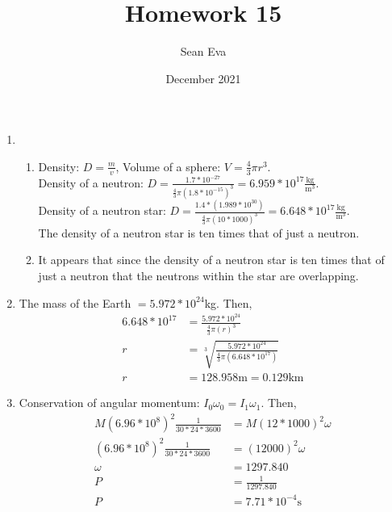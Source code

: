 \documentclass{article}
\title{Homework 15}
\author{Sean Eva}
\date{December 2021}
\begin{document}
\maketitle

\begin{enumerate}
    \item 
    
    \begin{enumerate}
        \item 
        
        Density: $D = \frac{m}{v}$, Volume of a sphere: $V = \frac{4}{3}\pi r^3$.\\Density of a neutron: $D = \frac{1.7*10^{-27}}{\frac{4}{3}\pi (1.8*10^{-15})^3} = 6.959*10^{17} \frac{\text{kg}}{\text{m}^3}$. \\Density of a neutron star: $D = \frac{1.4*(1.989*10^{30})}{\frac{4}{3}\pi(10*1000)^{3}} = 6.648*10^{17}\frac{\text{kg}}{\text{m}^3}$.\\
        The density of a neutron star is ten times that of just a neutron.
        
        \item
        
        It appears that since the density of a neutron star is ten times that of just a neutron that the neutrons within the star are overlapping.
        
    \end{enumerate}
    
    \item
    
    The mass of the Earth $ = 5.972*10^{24}$kg. Then,
    \begin{align*}
        6.648*10^{17} &= \frac{5.972*10^{24}}{\frac{4}{3}\pi(r)^3}\\
        r &= \sqrt[3]{\frac{5.972*10^{24}}{\frac{4}{3}\pi(6.648*10^{17})}}\\
        r &= 128.958\text{m} = 0.129 \text{km}
    \end{align*}
    
    \item
    
    Conservation of angular momentum: $I_0\omega_0 = I_1\omega_1$. Then, 
    \begin{align*}
        M (6.96*10^8)^2 \frac{1}{30*24*3600} &= M (12*1000)^2 \omega\\
        (6.96*10^8)^2 \frac{1}{30*24*3600} &= (12000)^2 \omega\\
        \omega &= 1297.840\\
        P &= \frac{1}{1297.840}\\
        P &= 7.71*10^{-4}\text{s}
    \end{align*}
    

\end{enumerate}
\end{document}
